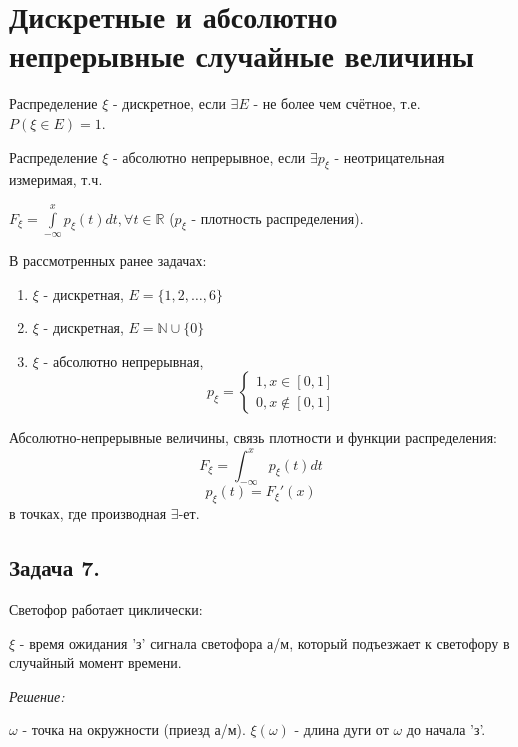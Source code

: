 \section*{Дискретные и абсолютно непрерывные случайные величины}

\noindent Распределение $\xi$ - дискретное, если $\exists E$ - не более чем счётное, т.е. $P(\xi \in E) = 1$.

\noindent Распределение $\xi$ - абсолютно непрерывное, если $\exists p_{\xi}$ - неотрицательная измеримая, т.ч. 

\noindent $F_{\xi} = \int\limits_{-\infty}^{x} p_{\xi} (t)dt, \forall t \in \mathbb{R}$ ($p_{\xi}$ - плотность распределения).

\noindent В рассмотренных ранее задачах:
\begin{enumerate}
	\item $\xi$ - дискретная, $E = \{1,2,\dots,6\}$
	\item $\xi$ - дискретная, $E = \mathbb{N} \cup \{0\}$
	\item $\xi$ - абсолютно непрерывная,
	\[ p_{\xi} =
	\begin{cases}
		1, x \in [0,1] \\
		0, x \notin [0,1]
	\end{cases}
	\]
\end{enumerate}

Абсолютно-непрерывные величины, связь плотности и функции распределения:
\[ F_{\xi} = \int_{-\infty}^{x} p_{\xi} (t) dt \]
\[ p_{\xi}(t) = F_{\xi}'(x) \]
в точках, где производная $\exists$-ет.

\subsection*{Задача 7.}

Светофор работает циклически:
\begin{figure}[H]
\end{figure}
$\xi$ - время ожидания 'з' сигнала светофора а/м, который подъезжает к светофору в случайный момент времени.

\noindent \textit{Решение:}

\noindent $\omega$ - точка на окружности (приезд а/м). $\xi(\omega)$ - длина дуги от $\omega$ до начала 'з'.

